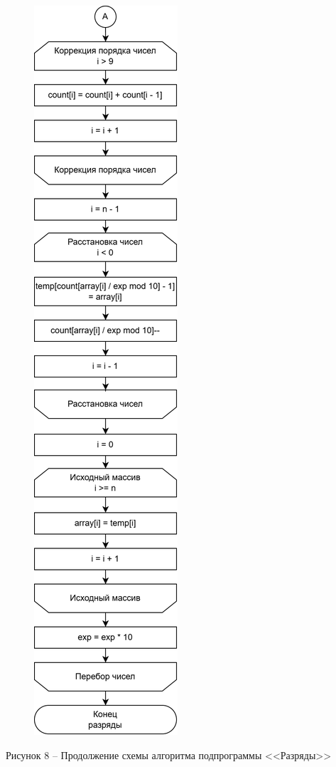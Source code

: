 \documentclass[a4paper,14pt]{extarticle}
\begin{document}
	\pagebreak
	\begin{figure}[h]
		\centering
		\includegraphics[width=0.23\linewidth]{images/s-2-4}
	\end{figure}
	\begin{center}
		Рисунок 8 – Продолжение схемы алгоритма подпрограммы <<Разряды>>
	\end{center}
\end{document}
